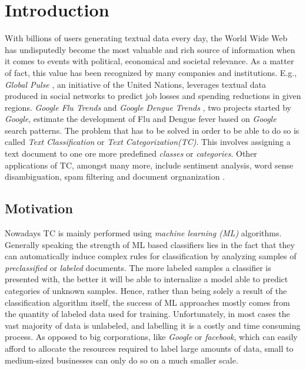 
\chapter{Introduction}
\label{ch:Introduction}

With billions of users generating textual data every day, the World
Wide Web has undisputedly become the most valuable and rich source
of information when it comes to events with political, economical and
societal relevance. As a matter of fact, this value has been recognized by
many companies and institutions. E.g., \emph{Global Pulse} \cite{globalpulse},
an initiative of the United Nations, leverages textual data produced in social networks to predict job
losses and spending reductions in given regions.
\emph{Google Flu Trends} and \emph{Google Dengue Trends} \cite{googlefludengue},
two projects started by \emph{Google}, estimate the development of Flu and Dengue fever based on \emph{Google} search
patterns. The problem that has to be solved in order to
be able to do so is called \emph{Text Classification} or \emph{Text Categorization(TC)}. This involves
assigning a text document to one ore more predefined \emph{classes} or \emph{categories}. 
Other applications of TC, amongst many more, include sentiment analysis, word
sense disambiguation, spam filtering and document orgnanization \cite{sebastiani2002machine}. 

\section{Motivation}
\label{sec:Motivation}
Nowadays TC is mainly performed using \emph{machine learning (ML)} algorithms.
Generally speaking the strength of ML based classifiers lies in the fact
that they can automatically induce complex rules for classification by
analyzing samples of \textit{preclassified} or \textit{labeled} documents. 
The more labeled samples a classifier is presented with, the better it will be
able to internalize a model able to predict categories of unknown samples. 
Hence, rather than being solely a result of the classification algorithm itself,
the success of ML approaches mostly comes from the quantity of labeled
data used for training. Unfortunately, in most cases the vast majority of
data is unlabeled, and labelling it is a costly and time consuming process. 
As opposed to big corporations, like \emph{Google} or \emph{facebook}, which can
easily afford to allocate the resources required to label large amounts of data, 
small to medium-sized businesses can only do so on a much smaller scale. 

